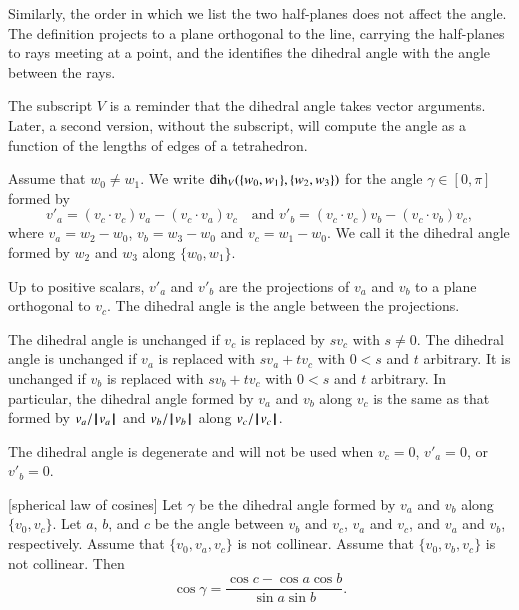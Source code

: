 Similarly, the order in which we list 
the two half-planes does not affect
the angle.  The definition projects
to a plane orthogonal to the line, carrying
the half-planes to rays meeting at a point, and
the identifies the dihedral angle with the angle
between the rays.

The subscript $V$ is a reminder 
that the dihedral angle takes vector arguments.
Later, a second version, without the subscript, will
compute the angle as a function of the lengths of edges of a 
tetrahedron.


\begin{definition}\label{def:dih} Assume that $w_0\ne w_1$.
We write $\operatorname{dih}_V(\{w_0,w_1\},\{w_2,w_3\})$ for the angle $\gamma\in[0,\pi]$
formed
by 
    $$
    v'_a = (v_c\cdot v_c) v_a - (v_c\cdot v_a) v_c\quad\text{and }v'_b =
            (v_c\cdot v_c) v_b - (v_c\cdot v_b) v_c,
    $$
where $v_a = w_2-w_0$, $v_b=w_3-w_0$ and $v_c=w_1-w_0$.  We call it
the dihedral angle formed by $w_2$ and $w_3$ along $\{w_0,w_1\}$.
\end{definition}

Up to positive scalars, $v'_a$ and $v'_b$ are the projections of
$v_a$ and $v_b$ to a plane orthogonal to $v_c$.  The
dihedral angle is the angle between the projections.

The dihedral angle is unchanged if $v_c$ is replaced by $s v_c$ with
$s\ne0$. The dihedral angle is unchanged if $v_a$ is replaced with
$s v_a + t v_c$ with $0 < s$ and $t$ arbitrary.  It is unchanged if
$v_b$ is replaced with $s v_b + t v_c$ with $0 < s$ and $t$
arbitrary.  In particular, the dihedral angle formed by $v_a$ and
$v_b$ along $v_c$ is the same as that formed by $v_a/{{\hskip0.1em|\hskip-0.15em|\hskip0.1em}v_a{\hskip0.1em|\hskip-0.15em|\hskip0.1em}}$ and
$v_b/{{\hskip0.1em|\hskip-0.15em|\hskip0.1em}v_b{\hskip0.1em|\hskip-0.15em|\hskip0.1em}}$ along $v_c/{{\hskip0.1em|\hskip-0.15em|\hskip0.1em}v_c{\hskip0.1em|\hskip-0.15em|\hskip0.1em}}$.

The dihedral angle is degenerate and will not be used when $v_c =
0$, $v'_a = 0$, or $v'_b = 0$.




\begin{lemma}[spherical law of cosines]\label{lemma:sloc}
Let $\gamma$ be the dihedral angle formed by $v_a$ and $v_b$ along
$\{v_0,v_c\}$.  Let $a$, $b$, and $c$ be the
angle between $v_b$ and $v_c$, $v_a$ and $v_c$, and $v_a$ and
$v_b$, respectively. %
Assume that $\{v_0,v_a,v_c\}$ is not
collinear. Assume that $\{v_0,v_b,v_c\}$ is not collinear.
Then
    $$\cos\gamma = \frac{\cos c - \cos a \cos b}{\sin a\sin b}.$$
\end{lemma}

